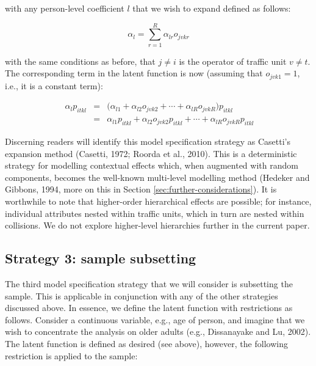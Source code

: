 \documentclass[]{elsarticle} %
\begin{document}
\noindent with any person-level coefficient \(l\) that we wish to expand
defined as follows:

\begin{equation}
\label{eq:hierarchical-traffic-unit-coefficients}
\alpha_{l}=\sum_{r=1}^R\alpha_{lr}o_{jvkr}
\end{equation}

\noindent with the same conditions as before, that \(j\ne i\) is the
operator of traffic unit \(v\ne t\). The corresponding term in the
latent function is now (assuming that \(o_{jvk1}=1\), i.e., it is a
constant term):

\begin{equation}
\label{eq:hierarchical-traffic-unit-coefficients}
\begin{array}{rcl}\
\alpha_{l}p_{itkl} &=& \big(\alpha_{l1} + \alpha_{l2}o_{jvk2} + \cdots + \alpha_{lR}o_{jvkR} \big)p_{itkl}\\
&=& \alpha_{l1}p_{itkl} + \alpha_{l2}o_{jvk2}p_{itkl} + \cdots + \alpha_{lR}o_{jvkR}p_{itkl}
\end{array} 
\end{equation}

Discerning readers will identify this model specification strategy as
Casetti's expansion method (Casetti, 1972; Roorda et al., 2010). This is
a deterministic strategy for modelling contextual effects which, when
augmented with random components, becomes the well-known multi-level
modelling method (Hedeker and Gibbons, 1994, more on this in Section
\ref{sec:further-considerations}). It is worthwhile to note that
higher-order hierarchical effects are possible; for instance, individual
attributes nested within traffic units, which in turn are nested within
collisions. We do not explore higher-level hierarchies further in the
current paper.

\hypertarget{strategy-3-sample-subsetting}{%
\subsection{Strategy 3: sample
subsetting}\label{strategy-3-sample-subsetting}}

The third model specification strategy that we will consider is
subsetting the sample. This is applicable in conjunction with any of the
other strategies discussed above. In essence, we define the latent
function with restrictions as follows. Consider a continuous variable,
e.g., age of person, and imagine that we wish to concentrate the
analysis on older adults (e.g., Dissanayake and Lu, 2002). The latent
function is defined as desired (see above), however, the following
restriction is applied to the sample:
\end{document}
